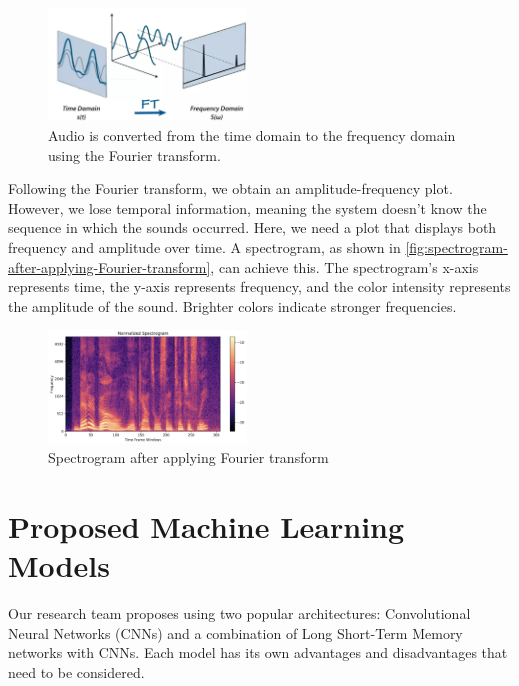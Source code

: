 \documentclass[twocolumn]{article}
\begin{document}
\vspace{-1em}
\begin{figure}[H]
  \centering
  \includegraphics[width=0.47\textwidth]{Audio-is-converted-from-the-time-domain-to-the-frequency-domain-using-the-Fourier-transform.png}
  \caption{Audio is converted from the time domain to the frequency domain using the Fourier transform. \cite{biswas2021fourier}}
  \label{fig:audio-is-converted-from-the-time-domain-to-the-frequency-domain-using-the-Fourier-transform}
\end{figure}
\vspace{-1em}

Following the Fourier transform, we obtain an amplitude-frequency plot. However, we lose
temporal information, meaning the system doesn't know the sequence in which the sounds
occurred. Here, we need a plot that displays both frequency and amplitude over time.
A spectrogram, as shown in \autoref{fig:spectrogram-after-applying-Fourier-transform}, can achieve this. The spectrogram's x-axis represents
time, the y-axis represents frequency, and the color intensity represents the amplitude
of the sound. Brighter colors indicate stronger frequencies.

\vspace{-1em}
\begin{figure}[H]
  \centering
  \includegraphics[width=0.47\textwidth]{Spectrogram-after-applying-Fourier-transform.png}
  \caption{Spectrogram after applying Fourier transform}
  \label{fig:spectrogram-after-applying-Fourier-transform}
\end{figure}
\vspace{-1em}

\section{Proposed Machine Learning Models}
Our research team proposes using two popular architectures:
Convolutional Neural Networks (CNNs) and a combination of
Long Short-Term Memory networks with CNNs. Each model has its own
advantages and disadvantages that need to be considered.
\end{document}
